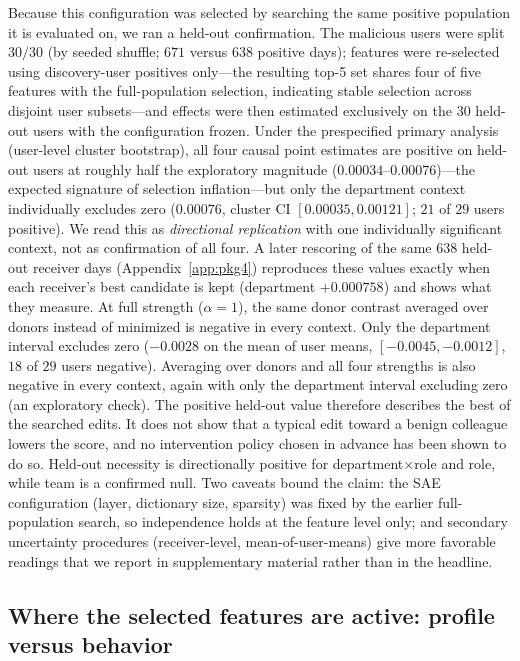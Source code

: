 \documentclass[10pt]{article} %
\begin{document}
Because this configuration was selected by searching the same positive
population it is evaluated on, we ran a held-out confirmation. The malicious
users were split $30/30$ (by seeded shuffle; $671$ versus $638$ positive
days); features were re-selected using discovery-user positives only---the
resulting top-5 set shares four of five features with the full-population
selection, indicating stable selection across disjoint user subsets---and
effects were then estimated exclusively on the $30$ held-out users with the
configuration frozen. Under the prespecified primary analysis (user-level cluster bootstrap),
all four causal point estimates are positive on held-out users at roughly
half the exploratory magnitude ($0.00034$--$0.00076$)---the expected
signature of selection inflation---but only the department context
individually excludes zero ($0.00076$, cluster CI $[0.00035, 0.00121]$;
$21$ of $29$ users positive). We read this as \emph{directional replication}
with one individually significant context, not as confirmation of all four.
A later rescoring of the same $638$ held-out receiver days
(Appendix~\ref{app:pkg4}) reproduces these values exactly when each
receiver's best candidate is kept (department $+0.000758$) and shows what
they measure. At full strength ($\alpha{=}1$), the same donor contrast
averaged over donors instead of minimized is negative in every context. Only
the department interval excludes zero ($-0.0028$ on the mean of user means,
$[-0.0045, -0.0012]$, $18$ of $29$ users negative). Averaging over donors
and all four strengths is also negative in every context, again with only the
department interval excluding zero (an exploratory check). The
positive held-out value therefore describes the best of the searched edits.
It does not show that a typical edit toward a benign colleague lowers the
score, and no intervention policy chosen in advance has been shown to do so.
Held-out necessity is directionally positive for department$\times$role and
role, while team is a confirmed null. Two caveats bound the claim: the SAE
configuration (layer, dictionary size, sparsity) was fixed by the earlier
full-population search, so independence holds at the feature level only; and
secondary uncertainty procedures (receiver-level, mean-of-user-means) give
more favorable readings that we report in supplementary material rather than
in the headline.



\subsection{Where the selected features are active: profile versus behavior}
\label{sec:attribution}
\end{document}
